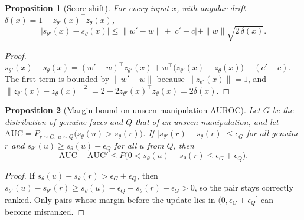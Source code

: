 \documentclass{ieeeaccess}
\newtheorem{proposition}{Proposition}
\begin{document}
\begin{proposition}[Score shift]
\label{prop:shift}
For every input $x$, with angular drift $\delta(x)=1-z_{\theta'}(x)^{\top}z_\theta(x)$,
\begin{equation}
|s_{\theta'}(x)-s_\theta(x)|\le\|w'-w\|+|c'-c|+\|w\|\sqrt{2\,\delta(x)} .
\label{eq:shift}
\end{equation}
\end{proposition}
\begin{proof}
$s_{\theta'}(x)-s_\theta(x)=(w'-w)^{\top}z_{\theta'}(x)+w^{\top}\big(z_{\theta'}(x)-z_\theta(x)\big)+(c'-c)$. The first term is bounded by $\|w'-w\|$ because $\|z_{\theta'}(x)\|=1$, and $\|z_{\theta'}(x)-z_\theta(x)\|^2=2-2z_{\theta'}(x)^{\top}z_\theta(x)=2\delta(x)$.
\end{proof}

\begin{proposition}[Margin bound on unseen-manipulation AUROC]
\label{prop:auc}
Let $G$ be the distribution of genuine faces and $Q$ that of an unseen manipulation, and let $\mathrm{AUC}=P_{r\sim G,\,u\sim Q}\big(s_\theta(u)>s_\theta(r)\big)$. If $|s_{\theta'}(r)-s_\theta(r)|\le\epsilon_G$ for all genuine $r$ and $s_{\theta'}(u)\ge s_\theta(u)-\epsilon_Q$ for all $u$ from $Q$, then
\begin{equation}
\mathrm{AUC}-\mathrm{AUC}'\le P\big(0<s_\theta(u)-s_\theta(r)\le\epsilon_G+\epsilon_Q\big).
\label{eq:auc}
\end{equation}
\end{proposition}
\begin{proof}
If $s_\theta(u)-s_\theta(r)>\epsilon_G+\epsilon_Q$, then $s_{\theta'}(u)-s_{\theta'}(r)\ge s_\theta(u)-\epsilon_Q-s_\theta(r)-\epsilon_G>0$, so the pair stays correctly ranked. Only pairs whose margin before the update lies in $(0,\epsilon_G+\epsilon_Q]$ can become misranked.
\end{proof}
\end{document}
